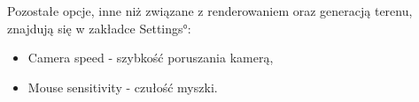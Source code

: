 Pozostałe opcje, inne niż związane z renderowaniem oraz generacją terenu, znajdują się w zakładce \ang{Settings}:

\begin{itemize}
\item Camera speed - szybkość poruszania kamerą,
\item Mouse sensitivity - czułość myszki.
\end{itemize}

%
%
%
%
%


